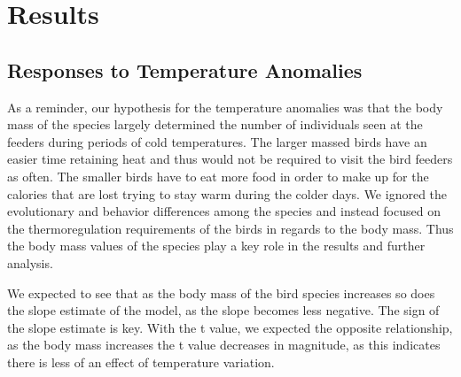 \chapter{Results}

\section{Responses to Temperature Anomalies}



\lstset{style=mystyle}

As a reminder, our hypothesis for the temperature anomalies was that the body mass of the species largely determined the number of individuals seen at the feeders during periods of cold temperatures. The larger massed birds have an easier time retaining heat and thus would not be required to visit the bird feeders as often. The smaller birds have to eat more food in order to make up for the calories that are lost trying to stay warm during the colder days. We ignored the evolutionary and behavior differences among the species and instead focused on the thermoregulation requirements of the birds in regards to the body mass. Thus the body mass values of the species play a key role in the results and further analysis. 

We expected to see that as the body mass of the bird species increases so does the slope estimate of the model, as the slope becomes less negative. The sign of the slope estimate is key. With the t value, we expected the opposite relationship, as the body mass increases the t value decreases in magnitude, as this indicates there is less of an effect of temperature variation.


